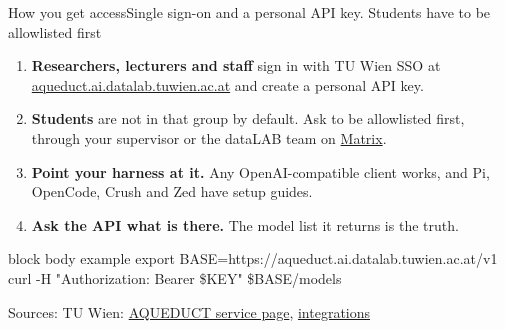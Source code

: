\documentclass[aspectratio=169]{beamer}
\newcommand{\srcmulti}[1]{\par\vfill{\fontsize{7}{8}\selectfont\color{ACINgray}Sources: #1}}
\begin{document}
\begin{frame}{How you get access}{Single sign-on and a personal API key. Students have to be allowlisted first}
\small
\begin{enumerate}\itemsep5pt
  \item \textbf{Researchers, lecturers and staff} sign in with TU Wien SSO at \href{https://aqueduct.ai.datalab.tuwien.ac.at/}{aqueduct.ai.datalab.tuwien.ac.at} and create a personal API key.
  \item \textbf{Students} are not in that group by default. Ask to be allowlisted first, through your supervisor or the dataLAB team on \href{https://matrix.to/\#/\#llm-service:tuwien.ac.at}{Matrix}.
  \item \textbf{Point your harness at it.} Any OpenAI-compatible client works, and Pi, OpenCode, Crush and Zed have setup guides.
  \item \textbf{Ask the API what is there.} The model list it returns is the truth.
\end{enumerate}
\vspace{2mm}
\begin{beamercolorbox}[sep=1ex,wd=\textwidth]{block body example}
{\fontsize{7.5}{10}\selectfont\ttfamily
export BASE=https://aqueduct.ai.datalab.tuwien.ac.at/v1\\
curl -H "Authorization: Bearer \$KEY" \$BASE/models}
\end{beamercolorbox}
\srcmulti{TU Wien: \href{https://datalab.tuwien.ac.at/aiml/aqueduct/}{AQUEDUCT service page}, \href{https://datalab.tuwien.ac.at/aiml/aqueduct/integrations/}{integrations}}
\end{frame}
\end{document}
